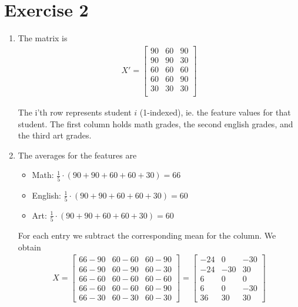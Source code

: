 \documentclass{article}
\begin{document}
\section*{Exercise 2}
\begin{enumerate}
	\item The matrix is 
	\begin{align*}
		X' = \begin{bmatrix}
			90 & 60 & 90 \\
			90 & 90 & 30 \\
			60 & 60 & 60 \\
			60 & 60 & 90 \\
			30 & 30 & 30 \\			
		\end{bmatrix}
	\end{align*}
	
	The i'th row represents student $i$ (1-indexed), ie. the feature values for that student. The first column holds math grades, the second english grades, and the third art grades.  
	
	\item The averages for the features are
	\begin{itemize}
		\item Math: \(\frac{1}{5}\cdot (90+90+60+60+30) = 66 \)
		\item English: \(\frac{1}{5}\cdot (90+90+60+60+30) = 60 \)
		\item Art: \(\frac{1}{5}\cdot (90+90+60+60+30) = 60 \)
	\end{itemize}

	For each entry we subtract the corresponding mean for the column. We obtain
	\begin{align*}
	X  = \begin{bmatrix}
			66-90 & 60-60 & 60-90 \\
			66-90 & 60-90 & 60-30 \\
			66-60 & 60-60 & 60-60 \\
			66-60 & 60-60 & 60-90 \\
			66-30 & 60-30 & 60-30 			
		\end{bmatrix}
		= \begin{bmatrix}
			-24 & 0   & -30 \\
			-24 & -30 & 30 \\
			6   & 0   & 0 \\
			6   & 0   & -30 \\
			36  & 30  & 30 			
		\end{bmatrix}
	\end{align*}
	

\end{enumerate}
\end{document}
